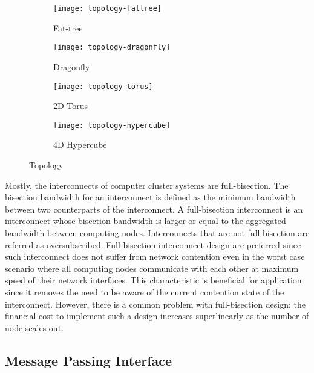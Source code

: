 \begin{figure}
    \centering
    \begin{subfigure}{.45\linewidth}
        \centering
        \texttt{[image: topology-fattree]}
        \caption{Fat-tree}%
        \label{fig:topology-fattree}
    \end{subfigure}
    \begin{subfigure}{.45\linewidth}
        \centering
        \texttt{[image: topology-dragonfly]}
        \caption{Dragonfly}%
        \label{fig:topology-dragonfly}
    \end{subfigure}
    \par\bigskip
    \begin{subfigure}{.45\linewidth}
        \centering
        \texttt{[image: topology-torus]}
        \caption{2D Torus}%
        \label{fig:topology-torus}
    \end{subfigure}
    \begin{subfigure}{.45\linewidth}
        \centering
        \texttt{[image: topology-hypercube]}
        \caption{4D Hypercube}%
        \label{fig:topology-hypercube}
    \end{subfigure}
    \caption{Topology}%
    \label{fig:topology}
\end{figure}


Mostly, the interconnects of computer cluster systems are full-bisection.
The bisection bandwidth for an interconnect is defined as the minimum
bandwidth between two counterparts of the interconnect. A full-bisection
interconnect is an interconnect whose bisection bandwidth is larger or equal
to the aggregated bandwidth between computing nodes. Interconnects that are
not full-bisection are referred as oversubscribed. Full-bisection interconnect
design are preferred since such interconnect does not suffer from network
contention even in the worst case scenario where all computing nodes
communicate with each other at maximum speed of their network interfaces. This
characteristic is beneficial for application since it removes the need to be
aware of the current contention state of the interconnect. However, there is a
common problem with full-bisection design: the financial cost to implement
such a design increases superlinearly as the number of node scales out.

\subsection{Message Passing Interface}\label{i-mpi}

